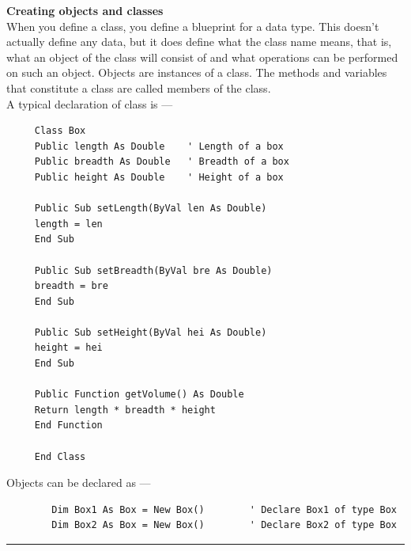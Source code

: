 \documentclass[11pt,dvipsnames,cmyk]{article}
\begin{document}
	 \hfill\break\textbf{Creating objects and classes}\\
	 When you define a class, you define a blueprint for a data type. This doesn't actually define any data, but it does define what the class name means, that is, what an object of the class will consist of and what operations can be performed on such an object. Objects are instances of a class. The methods and variables that constitute a class are called members of the class.\\
	 A typical declaration of class is ---
	 \begin{verbatim}
	 Class Box
	 Public length As Double    ' Length of a box
	 Public breadth As Double   ' Breadth of a box
	 Public height As Double    ' Height of a box
	 
	 Public Sub setLength(ByVal len As Double)
	 length = len
	 End Sub
	 
	 Public Sub setBreadth(ByVal bre As Double)
	 breadth = bre
	 End Sub
	 
	 Public Sub setHeight(ByVal hei As Double)
	 height = hei
	 End Sub
	 
	 Public Function getVolume() As Double
	 Return length * breadth * height
	 End Function
	 
	 End Class
	 \end{verbatim}
	 Objects can be declared as ---
	 \begin{verbatim}
	 	Dim Box1 As Box = New Box()        ' Declare Box1 of type Box
	 	Dim Box2 As Box = New Box()        ' Declare Box2 of type Box
	 \end{verbatim}
	 \hfill\break\rule{6.27in}{1.2pt}
	 
\end{document}
